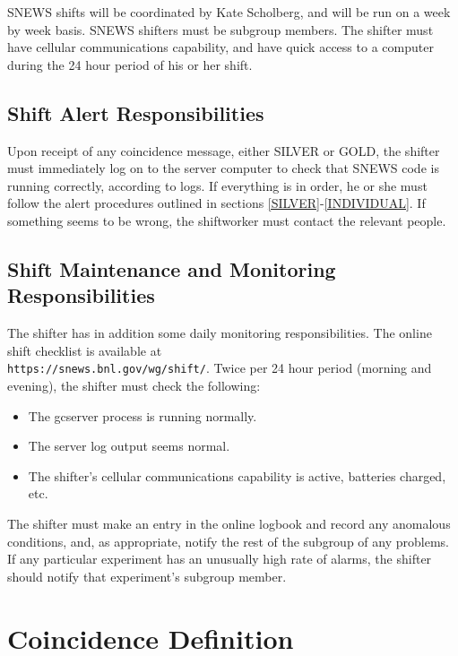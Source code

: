 \documentclass{article}
\begin{document}
SNEWS shifts will be coordinated by Kate Scholberg, and will be run on
a week by week basis.    SNEWS shifters must be subgroup members.
The shifter must have cellular communications capability, and
have quick access to a computer during the 24 hour period of
his or her shift.


\subsection{Shift Alert Responsibilities}

Upon receipt of any coincidence message, either SILVER or GOLD, the
shifter must immediately log on to the server computer to check that
SNEWS code is running correctly, according to logs.  If everything
is in order, he or she must follow
the alert procedures outlined in sections \ref{SILVER}-\ref{INDIVIDUAL}.  If
something seems to be wrong, the shiftworker must contact the
relevant people.

\subsection{Shift Maintenance and Monitoring Responsibilities}

The shifter has in addition some daily monitoring responsibilities.
The online shift checklist is available at\\
\texttt{https://snews.bnl.gov/wg/shift/}.
Twice per 24 hour period (morning and evening), 
the shifter must check the following:

\begin{itemize}
\item The gcserver process is running normally.
\item The server log output seems normal.
\item The shifter's cellular communications capability is active,
batteries charged, etc.

\end{itemize}

The shifter must make an entry in the online logbook and record any
anomalous conditions, and, as appropriate, notify the rest of the subgroup
of any problems.  If any particular experiment has an unusually
high rate of alarms, the shifter should notify that experiment's
subgroup member.



\section{Coincidence Definition}
\end{document}
